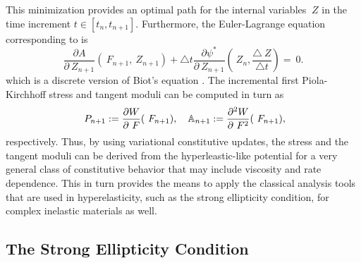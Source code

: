 \documentclass[12pt]{article}
\numberwithin{equation}{section}
\begin{document}
This minimization provides an optimal path for the internal variables
$~Z$ in the time increment $t \in [t_n, t_{n+1}]$. Furthermore, the
Euler-Lagrange equation corresponding to
 is
\begin{equation} \label{eq:Biots-equation-discrete}
  \frac{\partial A}{\partial ~Z_{n+1}}(~F_{n+1}, ~Z_{n+1})
  +
  \triangle t
  \frac{\partial \psi^*}{\partial ~Z_{n+1}}
  \left(~Z_n, \frac{\triangle ~Z}{\triangle t}\right)
  =
  ~0.
\end{equation}
which is a discrete version of Biot's equation
 \citep{Miehe.etal:2002}. The
incremental first Piola-Kirchhoff stress and tangent moduli can be
computed in turn as
\begin{equation} \label{eq:incremental-stress-moduli}
  ~P_{n+1} := \frac{\partial W}{\partial ~F} (~F_{n+1}),
  \quad
  \mathbb{A}_{n+1} := \frac{\partial^2 W}{\partial ~F^2} (~F_{n+1}),
\end{equation}
respectively. Thus, by using variational constitutive updates, the
stress and the tangent moduli can be derived from the
hyperleastic-like potential  for
a very general class of constitutive behavior that may include
viscosity and rate dependence. This in turn provides the means to
apply the classical analysis tools that are used in hyperelasticity,
such as the strong ellipticity condition, for complex inelastic
materials as well.

\subsection{The Strong Ellipticity Condition}
\end{document}

